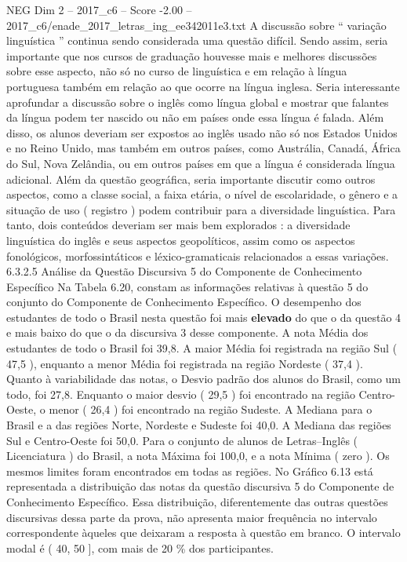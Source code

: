 \begin{textsample}{NEG Dim 2 – 2017\_c6 – Score -2.00 – 2017\_c6/enade\_2017\_letras\_ing\_ee342011e3.txt}
A discussão sobre “ variação linguística ” continua sendo considerada uma questão difícil.
Sendo assim, seria importante que nos cursos de graduação houvesse mais e melhores discussões sobre esse aspecto, não só no curso de linguística e em relação à língua portuguesa também em relação ao que ocorre na língua inglesa.
Seria interessante aprofundar a discussão sobre o inglês como língua global e mostrar que falantes da língua podem ter nascido ou não em países onde essa língua é falada.
Além disso, os alunos deveriam ser expostos ao inglês usado não só nos Estados Unidos e no Reino Unido, mas também em outros países, como Austrália, Canadá, África do Sul, Nova Zelândia, ou em outros países em que a língua é considerada língua adicional.
Além da questão geográfica, seria importante discutir como outros aspectos, como a classe social, a faixa etária, o nível de escolaridade, o gênero e a situação de uso ( registro ) podem contribuir para a diversidade linguística.
Para tanto, dois conteúdos deveriam ser mais bem explorados : a diversidade linguística do inglês e seus aspectos geopolíticos, assim como os aspectos fonológicos, morfossintáticos e léxico-gramaticais relacionados a essas variações. 6.3.2.5 Análise da Questão Discursiva 5 do Componente de Conhecimento Específico Na Tabela 6.20, constam as informações relativas à questão 5 do conjunto do Componente de Conhecimento Específico.
O desempenho dos estudantes de todo o Brasil nesta questão foi mais \textbf{elevado} do que o da questão 4 e mais baixo do que o da discursiva 3 desse componente.
A nota Média dos estudantes de todo o Brasil foi 39,8.
A maior Média foi registrada na região Sul ( 47,5 ), enquanto a menor Média foi registrada na região Nordeste ( 37,4 ).
Quanto à variabilidade das notas, o Desvio padrão dos alunos do Brasil, como um todo, foi 27,8.
Enquanto o maior desvio ( 29,5 ) foi encontrado na região Centro-Oeste, o menor ( 26,4 ) foi encontrado na região Sudeste.
A Mediana para o Brasil e a das regiões Norte, Nordeste e Sudeste foi 40,0.
A Mediana das regiões Sul e Centro-Oeste foi 50,0.
Para o conjunto de alunos de Letras–Inglês ( Licenciatura ) do Brasil, a nota Máxima foi 100,0, e a nota Mínima ( zero ).
Os mesmos limites foram encontrados em todas as regiões.
No Gráfico 6.13 está representada a distribuição das notas da questão discursiva 5 do Componente de Conhecimento Específico.
Essa distribuição, diferentemente das outras questões discursivas dessa parte da prova, não apresenta maior frequência no intervalo correspondente àqueles que deixaram a resposta à questão em branco.
O intervalo modal é ( 40, 50 ], com mais de 20 \% dos participantes.

\end{textsample}
